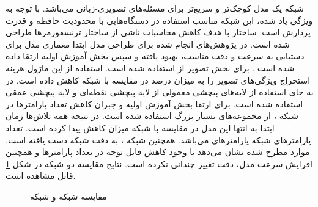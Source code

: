 شبکه
یک مدل کوچک‌تر و سریع‌تر برای مسئله‌های تصویری-زبانی می‌باشد. با توجه به ویژگی یاد شده، این شبکه مناسب استفاده در دستگاه‌هایی با محدودیت حافظه و قدرت پردارش است. ساختار 
با هدف کاهش محاسبات ناشی از ساختار ترنسفورمر‌ها طراحی شده است. در پژوهش‌های انجام شده برای طراحی مدل
 ابتدا معماری مدل برای دستیابی به سرعت و دقت مناسب، بهبود یافته و سپس بخش آموزش اولیه
  ارتقا داده شده است \cite{wang2020minivlm}.
\newline
 برای بخش تصویر از
استفاده شده است. استفاده از این ماژول هزینه استخراج ویژگی‌‌های تصویر را به میزان 
درصد در مقایسه با شبکه
\cite{li2020oscar}
کاهش داده است. در  به جای استفاده از لایه‌های پیچشی
 معمولی از لایه پیچشی نقطه‌ای
و لایه پیچشی عمقی
استفاده شده است.
\newline
برای ارتقا بخش آموزش اولیه و جبران کاهش تعداد پارامتر‌ها در شبکه ،
از مجموعه‌های بسیار بزرگ استفاده شده است.
\newline
در نتیجه همه تلاش‌ها زمان ابتدا به انتها این مدل در مقایسه با شبکه  میزان 
کاهش پیدا کرده است. تعداد پارامتر‌های شبکه 
 پارامتر‌های  می‌باشد. همچنین شبکه ، به
  دقت شبکه  دست یافته است. موارد مطرح شده نشان می‌دهد با وجود کاهش قابل توجه در تعداد پارامتر‌ها و همچنین افرایش سرعت مدل، دقت تغییر چندانی نکرده است. نتایج مقایسه دو شبکه در شکل
\ref{minivlm}
قابل مشاهده است.
\begin{figure}[H]
	\caption{مقایسه شبکه
		 و شبکه 
		\cite{wang2020minivlm}}
	\label{minivlm}
\end{figure}

